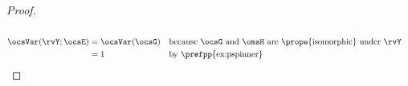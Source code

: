 \begin{tabstr}{0.75}
\begin{proof}
\begin{align*}
  \\
  \ocsVar(\rvY;\ocsE)
    &= \ocsVar(\ocsG)
    &&\text{because $\ocsG$ and $\omsH$ are \prope{isomorphic} under $\rvY$}
  \\&= 1
    && \text{by \prefpp{ex:pspinner}}
\end{align*}
\end{proof}






\end{tabstr}

